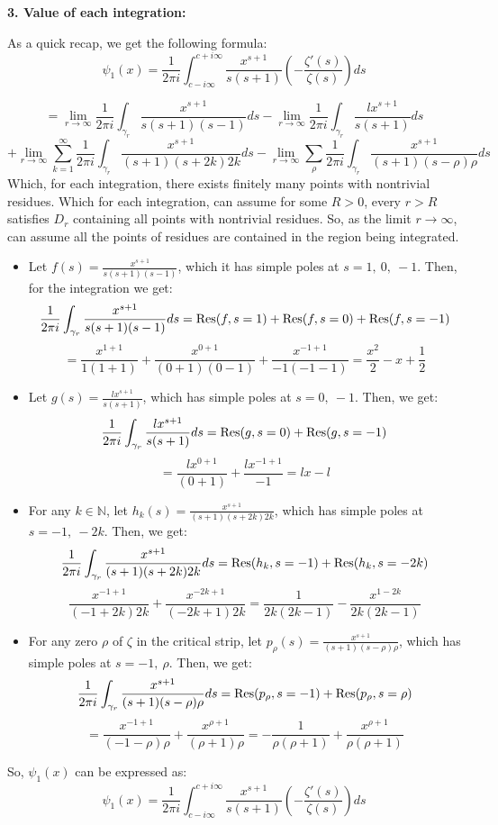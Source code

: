 \documentclass{article}
\begin{document}
\hfil

\textbf{3. Value of each integration:}

As a quick recap, we get the following formula:
$$\psi_1(x) = \frac{1}{2\pi i}\int_{c-i\infty}^{c+i\infty}\frac{x^{s+1}}{s(s+1)}\left(-\frac{\zeta'(s)}{\zeta(s)}\right)ds$$

\hfil

$$ = \lim_{r\rightarrow\infty}\frac{1}{2\pi i}\int_{\gamma_{r}}\frac{x^{s+1}}{s(s+1)(s-1)}ds-\lim_{r\rightarrow\infty}\frac{1}{2\pi i}\int_{\gamma_{r}}\frac{lx^{s+1}}{s(s+1)}ds$$
$$+ \lim_{r\rightarrow\infty}\sum_{k=1}^{\infty}\frac{1}{2\pi i}\int_{\gamma_{r}}\frac{x^{s+1}}{(s+1)(s+2k)2k}ds - \lim_{r\rightarrow\infty}\sum_{\rho}\frac{1}{2\pi i}\int_{\gamma_{r}}\frac{x^{s+1}}{(s+1)(s-\rho)\rho}ds$$
Which, for each integration, there exists finitely many points with nontrivial residues. Which for each integration, can assume for some $R>0$, every $r>R$ satisfies $D_r$ containing all points with nontrivial residues. So, as the limit $r\rightarrow\infty$, can assume all the points of residues are contained in the region being integrated.
\begin{itemize}
    \item Let $f(s)=\frac{x^{s+1}}{s(s+1)(s-1)}$, which it has simple poles at $s=1,\ 0,\ -1$. Then, for the integration we get:
    $$\frac{1}{2\pi i}\int_{\gamma_{r}}\frac{x^{s+1}}{s(s+1)(s-1)}ds = \textmd{Res}(f,s=1)+\textmd{Res}(f,s=0)+\textmd{Res}(f,s=-1)$$
    $$ = \frac{x^{1+1}}{1(1+1)}+\frac{x^{0+1}}{(0+1)(0-1)} + \frac{x^{-1+1}}{-1(-1-1)} = \frac{x^2}{2}-x + \frac{1}{2}$$
    \item Let $g(s)=\frac{lx^{s+1}}{s(s+1)}$, which has simple poles at $s=0,\ -1$. Then, we get:
    $$\frac{1}{2\pi i}\int_{\gamma_r}\frac{lx^{s+1}}{s(s+1)}ds = \textmd{Res}(g,s=0)+\textmd{Res}(g,s=-1)$$
    $$ = \frac{lx^{0+1}}{(0+1)} + \frac{lx^{-1+1}}{-1} = lx - l$$
    \item For any $k\in\mathbb{N}$, let $h_k(s)=\frac{x^{s+1}}{(s+1)(s+2k)2k}$, which has simple poles at $s=-1,\ -2k$. Then, we get:
    $$\frac{1}{2\pi i}\int_{\gamma_r}\frac{x^{s+1}}{(s+1)(s+2k)2k}ds = \textmd{Res}(h_k,s=-1)+\textmd{Res}(h_k,s=-2k)$$
    $$\frac{x^{-1+1}}{(-1+2k)2k}+\frac{x^{-2k+1}}{(-2k+1)2k} = \frac{1}{2k(2k-1)}-\frac{x^{1-2k}}{2k(2k-1)}$$
    \item For any zero $\rho$ of $\zeta$ in the critical strip, let $p_\rho(s) = \frac{x^{s+1}}{(s+1)(s-\rho)\rho}$, which has simple poles at $s=-1,\ \rho$. Then, we get:
    $$\frac{1}{2\pi i}\int_{\gamma_r}\frac{x^{s+1}}{(s+1)(s-\rho)\rho}ds = \textmd{Res}(p_{\rho},s=-1)+\textmd{Res}(p_{\rho},s=\rho)$$
    $$= \frac{x^{-1+1}}{(-1-\rho)\rho}+\frac{x^{\rho+1}}{(\rho+1)\rho} = -\frac{1}{\rho(\rho+1)}+\frac{x^{\rho+1}}{\rho(\rho+1)}$$
\end{itemize}
So, $\psi_1(x)$ can be expressed as:
$$\psi_1(x) = \frac{1}{2\pi i}\int_{c-i\infty}^{c+i\infty}\frac{x^{s+1}}{s(s+1)}\left(-\frac{\zeta'(s)}{\zeta(s)}\right)ds$$
\end{document}
